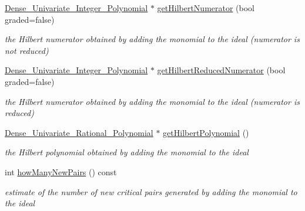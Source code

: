 \begin{Indent}
\begin{DoxyCompactItemize}
\hyperlink{group__polygroup_class_dense___univariate___integer___polynomial}{Dense\+\_\+\+Univariate\+\_\+\+Integer\+\_\+\+Polynomial} $\ast$ \hyperlink{group___g_b_computation_a26a40483e6f79118a5433ef255f77bb1}{get\+Hilbert\+Numerator} (bool graded=false)
\begin{DoxyCompactList}\small\item\em the Hilbert numerator obtained by adding the monomial to the ideal (numerator is {\itshape not} reduced) \end{DoxyCompactList}\item 
\mbox{\label{group___g_b_computation_ad703f1e2a2ee6f4f5862146f52d8b4e4}} 
\hyperlink{group__polygroup_class_dense___univariate___integer___polynomial}{Dense\+\_\+\+Univariate\+\_\+\+Integer\+\_\+\+Polynomial} $\ast$ \hyperlink{group___g_b_computation_ad703f1e2a2ee6f4f5862146f52d8b4e4}{get\+Hilbert\+Reduced\+Numerator} (bool graded=false)
\begin{DoxyCompactList}\small\item\em the Hilbert numerator obtained by adding the monomial to the ideal (numerator {\itshape is} reduced) \end{DoxyCompactList}\item 
\mbox{\label{group___g_b_computation_aea3816cc16c31cc0465f6e71b5499444}} 
\hyperlink{group__polygroup_class_dense___univariate___rational___polynomial}{Dense\+\_\+\+Univariate\+\_\+\+Rational\+\_\+\+Polynomial} $\ast$ \hyperlink{group___g_b_computation_aea3816cc16c31cc0465f6e71b5499444}{get\+Hilbert\+Polynomial} ()
\begin{DoxyCompactList}\small\item\em the Hilbert polynomial obtained by adding the monomial to the ideal \end{DoxyCompactList}\item 
\mbox{\label{group___g_b_computation_ae56bffc5abc6e09e0f393d90687b91ab}} 
int \hyperlink{group___g_b_computation_ae56bffc5abc6e09e0f393d90687b91ab}{how\+Many\+New\+Pairs} () const
\begin{DoxyCompactList}\small\item\em estimate of the number of new critical pairs generated by adding the monomial to the ideal \end{DoxyCompactList}\item 
\mbox{\label{group___g_b_computation_aa672d26c042569006512f3ac0fe1de34}} 

\end{DoxyCompactItemize}
\end{Indent}
